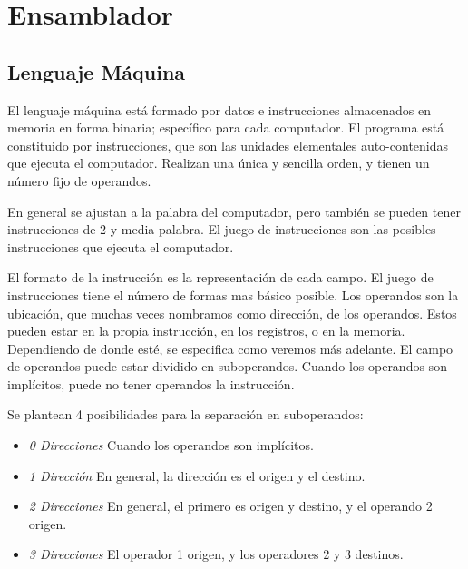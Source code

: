 \documentclass[a4paper,11pt,spanish]{report}
\begin{document}
\chapter{Ensamblador}
\section{Lenguaje Máquina}

El lenguaje máquina está formado por datos e instrucciones almacenados en memoria en forma binaria; específico para cada computador. El programa está constituido por instrucciones, que son las unidades elementales auto-contenidas que ejecuta el computador. Realizan una única y sencilla orden, y tienen un número fijo de operandos.

En general se ajustan a la palabra del computador, pero también se pueden tener instrucciones de 2 y media palabra. El juego de instrucciones son las posibles instrucciones que ejecuta el computador.
 
El formato de la instrucción es la representación de cada campo. El juego de instrucciones tiene el número de formas mas básico posible. Los operandos son la ubicación, que muchas veces nombramos como dirección, de los operandos. Estos pueden estar en la propia instrucción, en los registros, o en la memoria. Dependiendo de donde esté, se especifica como veremos más adelante. El campo de operandos puede estar dividido en suboperandos. Cuando los operandos son implícitos, puede no tener operandos la instrucción.

Se plantean 4 posibilidades para la separación en suboperandos:
\begin{itemize}
\item \emph{0 Direcciones} \textrightarrow Cuando los operandos son implícitos.
\item \emph{1 Dirección} \textrightarrow En general, la dirección es el origen y el destino.
\item \emph{2 Direcciones} \textrightarrow En general, el primero es origen y destino, y el operando 2 origen.
\item \emph{3 Direcciones} \textrightarrow El operador 1 origen, y los operadores 2 y 3 destinos.
\end{itemize}
\end{document}
